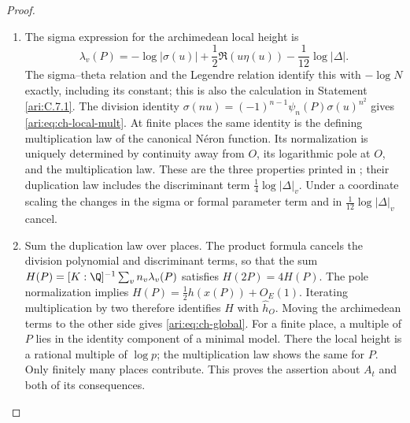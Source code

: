 \begin{proof}
\begin{enumerate}[label=\arabic*.,leftmargin=*]
\item The sigma expression for the archimedean local height is
\[
 \lambda_v(P)=-\log|\sigma(u)|
       +\frac12\Re(u\eta(u))-\frac1{12}\log|\Delta|.
\]
The sigma--theta relation and the Legendre relation identify this
with $-\log N$ exactly, including its constant; this is also the
calculation in Statement \ref{ari:C.7.1}. The division identity
$\sigma(nu)=(-1)^{n-1}\psi_n(P)\sigma(u)^{n^2}$ gives
\eqref{ari:eq:ch-local-mult}. At finite places the same identity is
the defining multiplication law of the canonical N\'eron function.
Its normalization is uniquely determined by continuity away from
$O$, its logarithmic pole at $O$, and the multiplication law.
These are the three properties printed in
\citet[Section 2.1]{demarco2017}; their duplication law includes
the discriminant term $\frac14\log|\Delta|_v$.
Under a coordinate scaling the changes in the sigma or formal
parameter term and in $\frac1{12}\log|\Delta|_v$ cancel.

\item Sum the duplication law over places. The product formula cancels
the division polynomial and discriminant terms, so that the sum
$H(P)=[K:\Q]^{-1}\sum_vn_v\lambda_v(P)$ satisfies
$H(2P)=4H(P)$. The pole normalization implies
$H(P)=\frac12h(x(P))+O_E(1)$. Iterating multiplication by two
therefore identifies $H$ with $\widehat h_O$. Moving the
archimedean terms to the other side gives \eqref{ari:eq:ch-global}.
For a finite place, a multiple of $P$ lies in the identity component
of a minimal model. There the local height is a rational multiple
of $\log p$; the multiplication law shows the same for $P$.
Only finitely many places contribute. This proves the assertion
about $A_t$ and both of its consequences.
\end{enumerate}
\end{proof}

